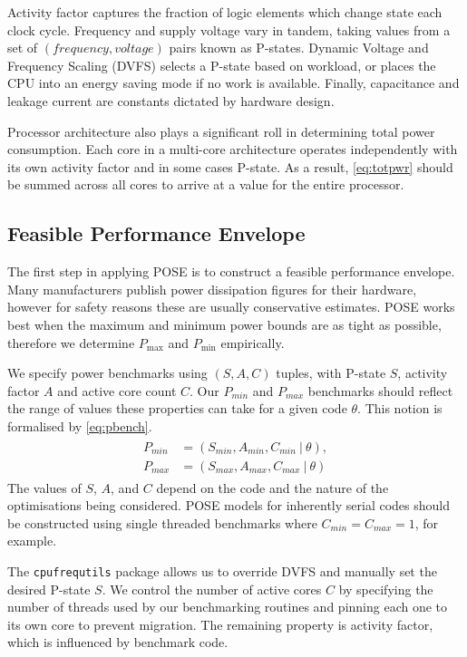 Activity factor captures the fraction of logic elements which change state each clock cycle.
Frequency and supply voltage vary in tandem, taking values from a set of $(frequency, voltage)$ pairs known as P-states.
Dynamic Voltage and Frequency Scaling (DVFS) selects a P-state based on workload, or places the CPU into an energy saving mode if no work is available.
Finally, capacitance and leakage current are constants dictated by hardware design.

Processor architecture also plays a significant roll in determining total power consumption.
Each core in a multi-core architecture operates independently with its own activity factor and in some cases P-state.
As a result, \autoref{eq:totpwr} should be summed across all cores to arrive at a value for the entire processor.

\subsection{Feasible Performance Envelope}
The first step in applying POSE is to construct a feasible performance envelope.
Many manufacturers publish power dissipation figures for their hardware, however for safety reasons these are usually conservative estimates.
POSE works best when the maximum and minimum power bounds are as tight as possible, therefore we determine $P_{\max}$ and $P_{\min}$ empirically.

We specify power benchmarks using $(S,A,C)$ tuples, with P-state $S$, activity factor $A$ and active core count $C$.
Our $P_{min}$ and $P_{max}$ benchmarks should reflect the range of values these properties can take for a given code $\theta$.
This notion is formalised by \autoref{eq:pbench}.
\begin{align}
  \label{eq:pbench}
  \begin{split}
    P_{min} &= (S_{min}, A_{min}, C_{min}~\vert~\theta), \\
    P_{max} &= (S_{max}, A_{max}, C_{max}~\vert~\theta) 
  \end{split}
\end{align}
The values of $S$, $A$, and $C$ depend on the code and the nature of the optimisations being considered.
POSE models for inherently serial codes should be constructed using single threaded benchmarks where $C_{min} = C_{max} = 1$, for example.

The \texttt{cpufrequtils} package allows us to override DVFS and manually set the desired P-state $S$.
We control the number of active cores $C$ by specifying the number of threads used by our benchmarking routines and pinning each one to its own core to prevent migration.
The remaining property is activity factor, which is influenced by benchmark code.

